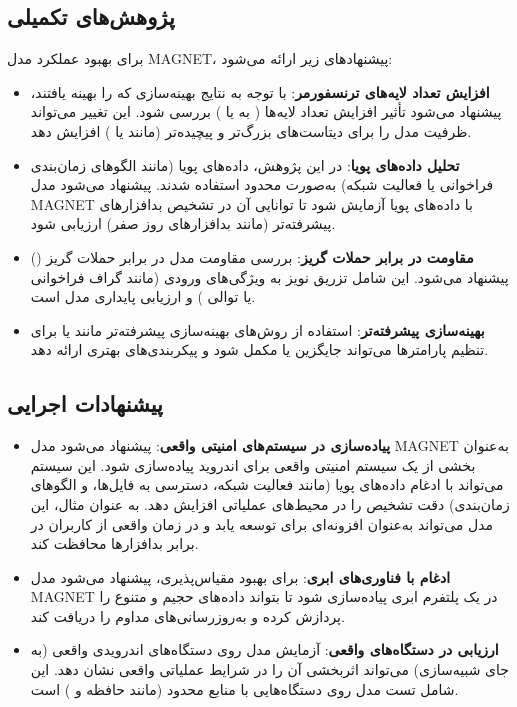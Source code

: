\subsection{پژوهش‌های تکمیلی}
برای بهبود عملکرد مدل MAGNET، پیشنهادهای زیر ارائه می‌شود:
\begin{itemize}
    \item \textbf{افزایش تعداد لایه‌های ترنسفورمر}: با توجه به نتایج بهینه‌سازی که  را بهینه یافتند، پیشنهاد می‌شود تأثیر افزایش تعداد لایه‌ها ( به  یا ) بررسی شود. این تغییر می‌تواند ظرفیت مدل را برای دیتاست‌های بزرگ‌تر و پیچیده‌تر (مانند  یا  \cite{AndroZoo}) افزایش دهد.
    \item \textbf{تحلیل داده‌های پویا}: در این پژوهش، داده‌های پویا (مانند الگوهای زمان‌بندی فراخوانی  یا فعالیت شبکه) به‌صورت محدود استفاده شدند. پیشنهاد می‌شود مدل MAGNET با داده‌های پویا آزمایش شود تا توانایی آن در تشخیص بدافزارهای پیشرفته‌تر (مانند بدافزارهای روز صفر) ارزیابی شود.
    \item \textbf{مقاومت در برابر حملات گریز}: بررسی مقاومت مدل در برابر حملات گریز () پیشنهاد می‌شود. این شامل تزریق نویز به ویژگی‌های ورودی (مانند گراف فراخوانی یا توالی ) و ارزیابی پایداری مدل است.
    \item \textbf{بهینه‌سازی پیشرفته‌تر}: استفاده از روش‌های بهینه‌سازی پیشرفته‌تر مانند  یا  برای تنظیم پارامترها می‌تواند جایگزین یا مکمل  \cite{Optuna2019} شود و پیکربندی‌های بهتری ارائه دهد.
\end{itemize}

\subsection{پیشنهادات اجرایی}
\begin{itemize}
    \item \textbf{پیاده‌سازی در سیستم‌های امنیتی واقعی}: پیشنهاد می‌شود مدل MAGNET به‌عنوان بخشی از یک سیستم امنیتی واقعی برای اندروید پیاده‌سازی شود. این سیستم می‌تواند با ادغام داده‌های پویا (مانند فعالیت شبکه، دسترسی به فایل‌ها، و الگوهای زمان‌بندی) دقت تشخیص را در محیط‌های عملیاتی افزایش دهد. به عنوان مثال، این مدل می‌تواند به‌عنوان افزونه‌ای برای  \cite{GooglePlayProtect} توسعه یابد و در زمان واقعی از کاربران در برابر بدافزارها محافظت کند.
    \item \textbf{ادغام با فناوری‌های ابری}: برای بهبود مقیاس‌پذیری، پیشنهاد می‌شود مدل MAGNET در یک پلتفرم ابری پیاده‌سازی شود تا بتواند داده‌های حجیم و متنوع را پردازش کرده و به‌روزرسانی‌های مداوم را دریافت کند.
    \item \textbf{ارزیابی در دستگاه‌های واقعی}: آزمایش مدل روی دستگاه‌های اندرویدی واقعی (به جای شبیه‌سازی) می‌تواند اثربخشی آن را در شرایط عملیاتی واقعی نشان دهد. این شامل تست مدل روی دستگاه‌هایی با منابع محدود (مانند حافظه و ) است.
\end{itemize}

